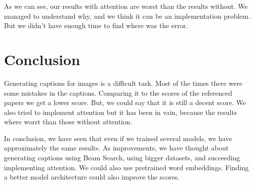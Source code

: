 \documentclass{article} %
\begin{document}
As we can see, our results with attention are worst than the results without. We managed to understand why, and we think it can be an implementation problem. But we didn't have enough time to find where was the error.

\section{Conclusion}

Generating captions for images is a difficult task. Most of the times there were some mistakes in the captions. Comparing it to the scores of the referenced papers we get a lower score. But, we could say that it is still a decent score. We also tried to implement attention but it has been in vain, because the results where worst than those without attention.

In conclusion, we have seen that even if we trained several models, we have approximately the same results. As improvements, we have thought about generating captions using Beam Search, using bigger datasets, and succeeding implementing attention. We could also use pretrained word embeddings. Finding a better model architecture could also improve the scores.



\end{document}
